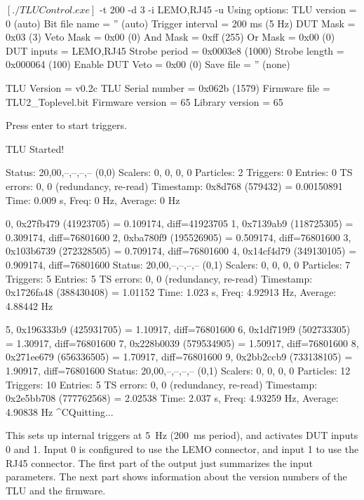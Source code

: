 \begin{listing}[mybash]
$[./TLUControl.exe]$ -t 200 -d 3 -i LEMO,RJ45 -u
Using options:
TLU version = 0 (auto)
Bit file name = '' (auto)
Trigger interval = 200 ms (5 Hz)
DUT Mask  = 0x03 (3)
Veto Mask = 0x00 (0)
And Mask  = 0xff (255)
Or Mask   = 0x00 (0)
DUT inputs = LEMO,RJ45
Strobe period = 0x0003e8 (1000)
Strobe length = 0x000064 (100)
Enable DUT Veto = 0x00 (0)
Save file = '' (none)

TLU Version = v0.2c
TLU Serial number = 0x062b (1579)
Firmware file = TLU2_Toplevel.bit
Firmware version = 65
Library version = 65

Press enter to start triggers.

TLU Started!

Status:    20,00,--,--,--,-- (0,0)
Scalers:   0, 0, 0, 0
Particles: 2
Triggers:  0
Entries:   0
TS errors: 0, 0 (redundancy, re-read)
Timestamp: 0x8d768 (579432) = 0.00150891
Time: 0.009 s, Freq: 0 Hz, Average: 0 Hz

        0, 0x27fb479 (41923705) = 0.109174, diff=41923705
        1, 0x7139ab9 (118725305) = 0.309174, diff=76801600
        2, 0xba780f9 (195526905) = 0.509174, diff=76801600
        3, 0x103b6739 (272328505) = 0.709174, diff=76801600
        4, 0x14cf4d79 (349130105) = 0.909174, diff=76801600
Status:    20,00,--,--,--,-- (0,1)
Scalers:   0, 0, 0, 0
Particles: 7
Triggers:  5
Entries:   5
TS errors: 0, 0 (redundancy, re-read)
Timestamp: 0x1726fa48 (388430408) = 1.01152
Time: 1.023 s, Freq: 4.92913 Hz, Average: 4.88442 Hz

        5, 0x196333b9 (425931705) = 1.10917, diff=76801600
        6, 0x1df719f9 (502733305) = 1.30917, diff=76801600
        7, 0x228b0039 (579534905) = 1.50917, diff=76801600
        8, 0x271ee679 (656336505) = 1.70917, diff=76801600
        9, 0x2bb2ccb9 (733138105) = 1.90917, diff=76801600
Status:    20,00,--,--,--,-- (0,1)
Scalers:   0, 0, 0, 0
Particles: 12
Triggers:  10
Entries:   5
TS errors: 0, 0 (redundancy, re-read)
Timestamp: 0x2e5bb708 (777762568) = 2.02538
Time: 2.037 s, Freq: 4.93259 Hz, Average: 4.90838 Hz
^CQuitting...
\end{listing}

This sets up internal triggers at 5~Hz (200~ms period), and activates DUT inputs 0 and 1.
Input 0 is configured to use the LEMO connector, and input 1 to use the RJ45 connector.
The first part of the output just summarizes the input parameters.
The next part shows information about the version numbers of the TLU and the firmware.

